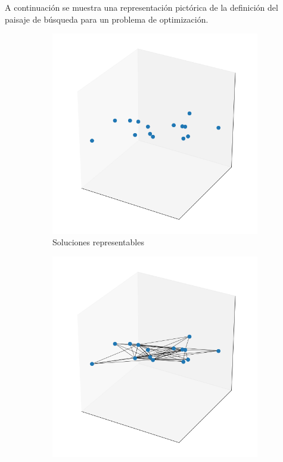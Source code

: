 A continuación se muestra una representación pictórica de la definición del paisaje de búsqueda para un problema de optimización.
\begin{figure}[H]
\begin{subfigure}{.4\textwidth}
    \includegraphics[scale=.5]{Imagenes/search1.png}
    \caption{Soluciones representables}
\end{subfigure}
\begin{subfigure}{.5\textwidth}
    \includegraphics[scale=.5]{Imagenes/search2.png}

\end{subfigure}
\end{figure}
